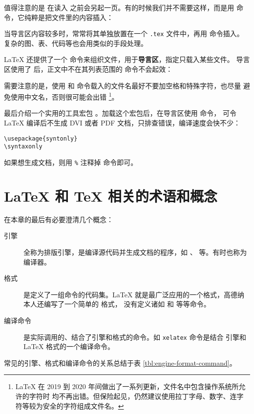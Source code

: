 值得注意的是  在读入  之前会另起一页。有的时候我们并不需要这样，而是用
 命令，它纯粹是把文件里的内容插入：
\begin{command}
\end{command}

当导言区内容较多时，常常将其单独放置在一个 \texttt{.tex} 文件中，再用  命令插入。
复杂的图、表、代码等也会用类似的手段处理。

\LaTeX{} 还提供了一个  命令来组织文件，用于\textbf{导言区}，指定只载入某些文件。
导言区使用了  后，正文中不在其列表范围的  命令不会起效：
\begin{command}
\end{command}

需要注意的是，使用  和  命令载入的文件名最好不要加空格和特殊字符，也尽量
避免使用中文名，否则很可能会出错%
\footnote{\LaTeX{} 在 2019 到 2020 年间做出了一系列更新，文件名中包含操作系统所允许的字符时
均不再出错。但保险起见，仍然建议使用拉丁字母、数字、连字符等较为安全的字符组成文件名。}。

最后介绍一个实用的工具宏包 。加载这个宏包后，在导言区使用  命令，
可令 \LaTeX{} 编译后不生成 DVI 或者 PDF 文档，只排查错误，编译速度会快不少：
\begin{verbatim}
\usepackage{syntonly}
\syntaxonly
\end{verbatim}

如果想生成文档，则用 \texttt\% 注释掉  命令即可。

\section{\LaTeX{} 和 \TeX{} 相关的术语和概念}\label{sec:concepts}

在本章的最后有必要澄清几个概念：
\begin{description}
  \item[引擎] 全称为排版引擎，是编译源代码并生成文档的程序，如 、 等。有时也称为编译器。
  \item[格式] 是定义了一组命令的代码集。\LaTeX{} 就是最广泛应用的一个格式，高德纳本人还编写了一个简单的  格式，
  没有定义诸如  和  等等命令。
  \item[编译命令] 是实际调用的、结合了引擎和格式的命令。如 \texttt{xelatex} 命令是结合 
  引擎和 \LaTeX{} 格式的一个编译命令。
\end{description}
常见的引擎、格式和编译命令的关系总结于表 \ref{tbl:engine-format-command}。

